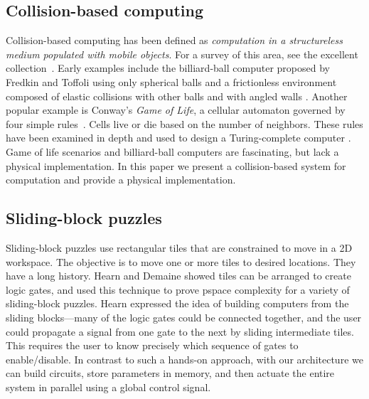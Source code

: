 \documentclass[letterpaper, 10 pt, conference]{ieeeconf}
\begin{document}
\subsection{Collision-based computing}
Collision-based computing has been defined as \emph{computation in a structureless medium populated with mobile objects}.  For a survey of this area, see the excellent collection~\cite{Adamatzky2012}. Early examples include the billiard-ball computer proposed by Fredkin and Toffoli using only spherical balls and a frictionless environment composed of elastic collisions with other balls and with angled walls \cite{Fredkin1982ConservativeLogic}. Another popular example is Conway's {\em Game of Life}, a cellular automaton governed by four simple rules~\cite{berlekamp2001winning}. Cells live or die based on the number of neighbors. These rules have been examined in depth and used to design a Turing-complete computer \cite{Adamatzky2002}.  Game of life scenarios and billiard-ball computers are fascinating, but lack a physical implementation.  In this paper we present a collision-based system for computation and provide a physical implementation.


\subsection{Sliding-block puzzles}
Sliding-block puzzles use rectangular tiles that are constrained to move in a 2D workspace. The objective is to move one or more tiles to desired locations. They have a long history.
Hearn \cite{hearn2005complexity} and Demaine \cite{Demaine2009} showed tiles can be arranged to create logic gates, and used this technique to prove {\sc pspace} complexity for a variety of sliding-block puzzles.  Hearn expressed the idea of building computers from the sliding blocks---many of the logic gates could be connected together, and the user could propagate a signal from one gate to the next by sliding intermediate tiles.  This requires the user to know precisely which sequence of gates to enable/disable.  In contrast to such a hands-on approach, with our architecture we can build circuits, store parameters in memory, and then actuate the entire system in parallel using a global control signal.
\end{document}
